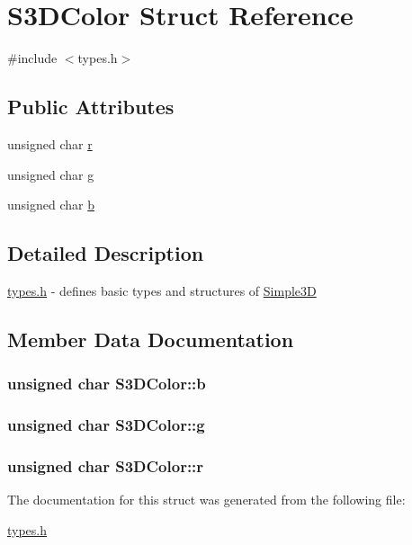 \hypertarget{struct_s3_d_color}{
\section{S3DColor Struct Reference}
\label{struct_s3_d_color}
}


{\ttfamily \#include $<$types.h$>$}

\subsection*{Public Attributes}
\begin{DoxyCompactItemize}
\item 
unsigned char \hyperlink{struct_s3_d_color_a4a7329c346d7745fd46b81a5d1cac393}{r}
\item 
unsigned char \hyperlink{struct_s3_d_color_a6f926b101765a5b848dfb5acdce1f1a4}{g}
\item 
unsigned char \hyperlink{struct_s3_d_color_af03f6858e55796ca988a17b15c2284b3}{b}
\end{DoxyCompactItemize}


\subsection{Detailed Description}
\hyperlink{types_8h}{types.h} -\/ defines basic types and structures of \hyperlink{class_simple3_d}{Simple3D} 

\subsection{Member Data Documentation}
\hypertarget{struct_s3_d_color_af03f6858e55796ca988a17b15c2284b3}{
\subsubsection[{b}]{\setlength{\rightskip}{0pt plus 5cm}unsigned char {\bf S3DColor::b}}}
\label{struct_s3_d_color_af03f6858e55796ca988a17b15c2284b3}
\hypertarget{struct_s3_d_color_a6f926b101765a5b848dfb5acdce1f1a4}{
\subsubsection[{g}]{\setlength{\rightskip}{0pt plus 5cm}unsigned char {\bf S3DColor::g}}}
\label{struct_s3_d_color_a6f926b101765a5b848dfb5acdce1f1a4}
\hypertarget{struct_s3_d_color_a4a7329c346d7745fd46b81a5d1cac393}{
\subsubsection[{r}]{\setlength{\rightskip}{0pt plus 5cm}unsigned char {\bf S3DColor::r}}}
\label{struct_s3_d_color_a4a7329c346d7745fd46b81a5d1cac393}


The documentation for this struct was generated from the following file:\begin{DoxyCompactItemize}
\item 
\hyperlink{types_8h}{types.h}\end{DoxyCompactItemize}
